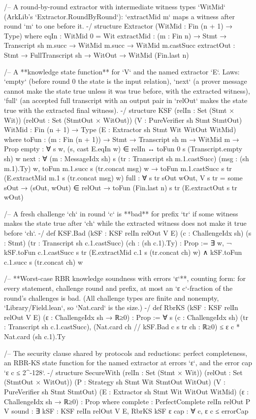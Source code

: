 \begin{leancode}[fontsize=\footnotesize,label={\footnotesize Contract/Security.lean (abridged)}]
/-- A round-by-round extractor with intermediate witness types `WitMid` (ArkLib's
`Extractor.RoundByRound`): `extractMid m` maps a witness after round `m` to one before it. -/
structure Extractor (WitMid : Fin (n + 1) → Type) where
  eqIn : WitMid 0 = Wit
  extractMid : (m : Fin n) → Stmt → Transcript sh m.succ → WitMid m.succ → WitMid m.castSucc
  extractOut : Stmt → FullTranscript sh → WitOut → WitMid (Fin.last n)

/-- A **knowledge state function** for `V` and the named extractor `E`. Laws: `empty` (before
round 0 the state is the input relation), `next` (a prover message cannot make the state true
unless it was true before, with the extracted witness), `full` (an accepted full transcript with
an output pair in `relOut` makes the state true with the extracted final witness). -/
structure KSF (relIn : Set (Stmt × Wit)) (relOut : Set (StmtOut × WitOut))
    (V : PureVerifier sh Stmt StmtOut) {WitMid : Fin (n + 1) → Type}
    (E : Extractor sh Stmt Wit WitOut WitMid) where
  toFun : (m : Fin (n + 1)) → Stmt → Transcript sh m → WitMid m → Prop
  empty : ∀ s w, (s, cast E.eqIn w) ∈ relIn ↔ toFun 0 s (Transcript.empty sh) w
  next : ∀ (m : MessageIdx sh) s (tr : Transcript sh m.1.castSucc) (msg : (sh m.1).Ty) w,
    toFun m.1.succ s (tr.concat msg) w → toFun m.1.castSucc s tr (E.extractMid m.1 s (tr.concat
        msg) w)
  full : ∀ s tr sOut wOut, V s tr = some sOut → (sOut, wOut) ∈ relOut →
    toFun (Fin.last n) s tr (E.extractOut s tr wOut)

/-- A fresh challenge `ch` in round `c` is **bad** for prefix `tr` if some witness makes the state
true after `ch` while the extracted witness does not make it true before `ch`. -/
def KSF.Bad (kSF : KSF relIn relOut V E) (c : ChallengeIdx sh) (s : Stmt)
    (tr : Transcript sh c.1.castSucc) (ch : (sh c.1).Ty) : Prop :=
  ∃ w, ¬ kSF.toFun c.1.castSucc s tr (E.extractMid c.1 s (tr.concat ch) w) ∧
    kSF.toFun c.1.succ s (tr.concat ch) w

/-- **Worst-case RBR knowledge soundness with errors `ε`**, counting form: for every statement,
challenge round and prefix, at most an `ε c`-fraction of the round's challenges is bad. (All
challenge types are finite and nonempty, `Library/Field.lean`, so `Nat.card` is the size.) -/
def RbrKS (kSF : KSF relIn relOut V E) (ε : ChallengeIdx sh → ℝ≥0) : Prop :=
  ∀ s (c : ChallengeIdx sh) (tr : Transcript sh c.1.castSucc),
    (Nat.card {ch // kSF.Bad c s tr ch} : ℝ≥0) ≤ ε c * Nat.card (sh c.1).Ty

/-- The security clause shared by protocols and reductions: perfect completeness, an RBR-KS
state function for the named extractor at errors `ε`, and the error cap `ε c ≤ 2^-128`. -/
structure SecureWith (relIn : Set (Stmt × Wit)) (relOut : Set (StmtOut × WitOut))
    (P : Strategy sh Stmt Wit StmtOut WitOut) (V : PureVerifier sh Stmt StmtOut)
    (E : Extractor sh Stmt Wit WitOut WitMid) (ε : ChallengeIdx sh → ℝ≥0) : Prop where
  complete : PerfectComplete relIn relOut P V
  sound : ∃ kSF : KSF relIn relOut V E, RbrKS kSF ε
  cap : ∀ c, ε c ≤ errorCap
\end{leancode}

